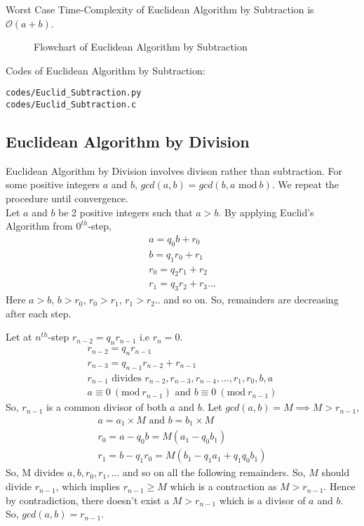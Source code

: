 \documentclass[journal,12pt,twocolumn]{IEEEtran}
\begin{document}
\quad Worst Case Time-Complexity of Euclidean Algorithm by Subtraction is $\mathcal{O}(a+b)$.\\

\begin{figure}[h!]
	\begin{center}
		\resizebox{\columnwidth/1}{!}{}
	\end{center}
	\caption{Flowchart of Euclidean Algorithm by Subtraction}
	\label{fig:Input}
\end{figure}

Codes of Euclidean Algorithm by Subtraction:
\begin{lstlisting}
codes/Euclid_Subtraction.py
codes/Euclid_Subtraction.c
\end{lstlisting}

\subsection{Euclidean Algorithm by Division}
Euclidean Algorithm by Division involves divison rather than subtraction. For some positive integers $a$ and $b$, $gcd(a, b) = gcd(b, a \textrm{ mod}\ b)$. We repeat the procedure until convergence.\\

Let $a$ and $b$ be 2 positive integers such that $a > b$. By applying Euclid's Algorithm from $0^{th}$-step,\\
\begin{align}
	a = q_{0}b + r_{0}\\
	b = q_{1}r_{0} + r_{1}\\
	r_{0} = q_{2}r_{1} + r_{2}\\
	r_{1} = q_{3}r_{2} + r_{3}...
\end{align}
Here $a > b$, $ b > r_{0}$, $r_{0} > r_{1}$, $r_{1} > r_{2}$.. and so on. So, remainders are decreasing after each step.

Let at $n^{th}$-step $r_{n-2} = q_{n}r_{n-1}$ i.e $r_{n} = 0$.
 \begin{align}
    r_{n-2} = q_{n}r_{n-1}\\
    r_{n-3} = q_{n-1}r_{n-2} + r_{n-1}\\
    r_{n-1} \text{ divides } r_{n-2}, r_{n-3}, r_{n-4},..., r_{1}, r_{0}, b, a\\
    a \equiv 0\ (\textrm{mod}\ r_{n-1}) \text{ and } b \equiv 0\ (\textrm{mod}\ r_{n-1})
\end{align}
So, $r_{n-1}$ is a common divisor of both $a$ and $b$. Let $gcd(a,b) = M \implies M > r_{n-1}$,\\
\begin{align}
    a = a_{1} \times M \text{ and } b = b_{1} \times M\\
    r_{0} = a - q_{0}b = M(a_{1} - q_{0}b_{1})\\
    r_{1} = b - q_{1}r_{0} = M(b_{1} - q_{1}a_{1} + q_{1}q_{0}b_{1})
\end{align}
So, M divides $a, b, r_{0}, r_{1}, ... $ and so on all the following remainders. So, $M$ should divide $r_{n-1}$, which implies $r_{n-1} \geq M$ which is a contraction as $M > r_{n-1}$. Hence by contradiction, there doesn't exist a $M > r_{n-1}$ which is a divisor of $a$ and $b$. So, $gcd(a,b) = r_{n-1}$.\\
\end{document}
